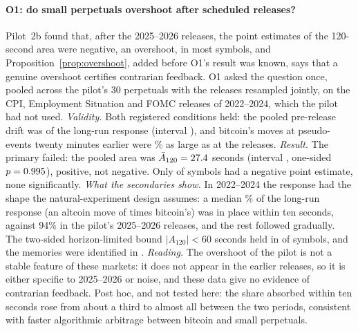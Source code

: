 \paragraph{O1: do small perpetuals overshoot after scheduled releases?} Pilot~2b found that, after the 2025--2026 releases, the point estimates of the 120-second area were negative, an overshoot, in most symbols, and Proposition~\ref{prop:overshoot}, added before O1's result was known, says that a genuine overshoot certifies contrarian feedback. O1 asked the question once, pooled across the pilot's 30 perpetuals with the releases resampled jointly, on the \OoneReleases{} CPI, Employment Situation and FOMC releases of 2022--2024, which the pilot had not used. \emph{Validity.} Both registered conditions held: the pooled pre-release drift was \OonePre{} of the long-run response (interval \OonePreCI{}), and bitcoin's moves at pseudo-events twenty minutes earlier were \OonePseudo\% as large as at the releases. \emph{Result.} The primary failed: the pooled area was $\bar A_{120}=27.4$ seconds (interval \OoneCI{}, one-sided $p=0.995$), positive, not negative. Only \OoneNeg{} of \OoneSymbols{} symbols had a negative point estimate, none significantly. \emph{What the secondaries show.} In 2022--2024 the response had the shape the natural-experiment design assumes: a median \OoneShare\% of the long-run response (an altcoin move of \OoneBeta{} times bitcoin's) was in place within ten seconds, against 94\% in the pilot's 2025--2026 releases, and the rest followed gradually. The two-sided horizon-limited bound $|A_{120}|<60$ seconds held in \OoneTwoSided{} of \OoneSymbols{} symbols, and the memories were identified in \OoneIdentified{}. \emph{Reading.} The overshoot of the pilot is not a stable feature of these markets: it does not appear in the earlier releases, so it is either specific to 2025--2026 or noise, and these data give no evidence of contrarian feedback. Post hoc, and not tested here: the share absorbed within ten seconds rose from about a third to almost all between the two periods, consistent with faster algorithmic arbitrage between bitcoin and small perpetuals.

